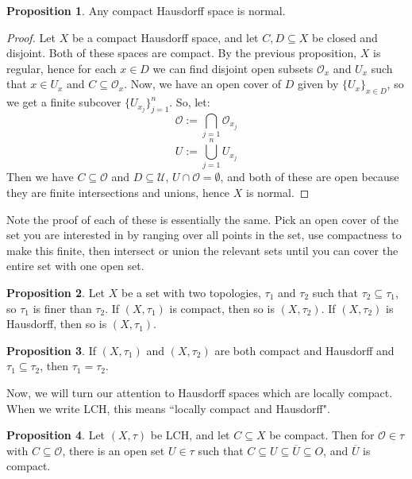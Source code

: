 \documentclass[11pt, oneside]{amsart}   	%
\theoremstyle{definition}
\newtheorem{prop}{Proposition}[section]
\begin{document}
	\begin{prop}
		Any compact Hausdorff space is normal.
	\end{prop}
	
	\begin{proof}
		Let $X$ be a compact Hausdorff space, and let $C, D\subseteq X$ be closed and disjoint. Both of these spaces 
		are compact. By the previous proposition, $X$ is regular, hence for each $x\in D$ we can find disjoint open 
		subsets $\mathcal O_x$ and $U_x$ such that $x\in U_x$ and $C\subseteq\mathcal O_x$. Now, we have an 
		open cover of $D$ given by $\{U_x\}_{x\in D}$, so we get a finite subcover $\{U_{x_j}\}_{j = 1}^n$. So, let:
		$$
			\mathcal O :=\bigcap_{j = 1}\mathcal O_{x_j}
		$$
		$$
			U := \bigcup_{j = 1}^n U_{x_j}
		$$
		Then we have $C\subseteq\mathcal O$ and $D\subseteq\mathcal U$, $U\cap\mathcal O = \emptyset$, and both 
		of these are open because they are finite intersections and unions, hence $X$ is normal.
	\end{proof}
	
	Note the proof of each of these is essentially the same. Pick an open cover of the set you are interested in by ranging 
	over all points in the set, use compactness to make this finite, then intersect or union the relevant sets until you 
	can cover the entire set with one open set.
	
	\begin{prop}
		Let $X$ be a set with two topologies, $\tau_1$ and $\tau_2$ such that $\tau_2\subseteq\tau_1$, so $\tau_1$ is 
		finer than $\tau_2$. If $(X, \tau_1)$ is compact, then so is $(X, \tau_2)$. If $(X, \tau_2)$ is Hausdorff, then so 
		is $(X, \tau_1)$. 
	\end{prop}
	
	\begin{prop}
		If $(X, \tau_1)$ and $(X, \tau_2)$ are both compact and Hausdorff and $\tau_1\subseteq \tau_2$, then $\tau_1 = 
		\tau_2$. 
	\end{prop}
	
	Now, we will turn our attention to Hausdorff spaces which are locally compact. When we write LCH, this means ``locally 
	compact and Hausdorff". 
	
	\begin{prop}
		Let $(X, \tau)$ be LCH, and let $C\subseteq X$ be compact. Then for $\mathcal O\in\tau$ with $C\subseteq
		\mathcal O$, there is an open set $U\in\tau$ such that $C\subseteq U\subseteq \overline U\subseteq O$, and 
		$\overline U$ is compact. 
	\end{prop}
	
\end{document}
